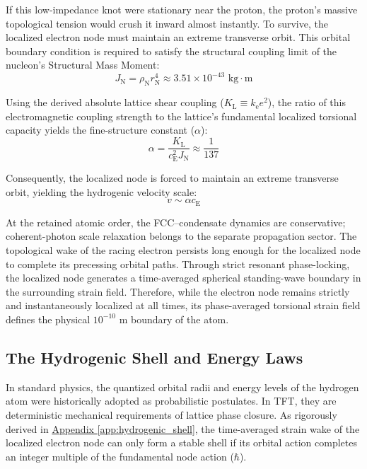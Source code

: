 If this low-impedance knot were stationary near the proton, the proton's massive topological tension would crush it inward almost instantly. To survive, the localized electron node must maintain an extreme transverse orbit. This orbital boundary condition is required to satisfy the structural coupling limit of the nucleon's Structural Mass Moment:
\begin{equation}
    J_{\mathrm{N}} = \rho_{\mathrm{N}} r_{\mathrm{N}}^4 \approx 3.51 \times 10^{-43} \text{ kg}\cdot\text{m}
\end{equation}

Using the derived absolute lattice shear coupling ($K_{\mathrm{L}} \equiv k_{\mathrm{e}} e^2$), the ratio of this electromagnetic coupling strength to the lattice's fundamental localized torsional capacity yields the fine-structure constant ($\alpha$):
\begin{equation}
    \alpha = \frac{K_{\mathrm{L}}}{c_{\mathrm{E}}^2 J_{\mathrm{N}}} \approx \frac{1}{137}
\end{equation}

Consequently, the localized node is forced to maintain an extreme transverse orbit, yielding the hydrogenic velocity scale:
\begin{equation}
    v \sim \alpha c_{\mathrm{E}}
\end{equation}

At the retained atomic order, the FCC--condensate dynamics are conservative; coherent-photon scale relaxation belongs to the separate propagation sector.
The topological wake of the racing electron persists long enough for the localized node to complete its precessing orbital paths. Through strict resonant phase-locking, the localized node generates a time-averaged spherical standing-wave boundary in the surrounding strain field. Therefore, while the electron node remains strictly and instantaneously localized at all times, its phase-averaged torsional strain field defines the physical $10^{-10}$ m boundary of the atom.

\subsection*{The Hydrogenic Shell and Energy Laws}
In standard physics, the quantized orbital radii and energy levels of the hydrogen atom were historically adopted as probabilistic postulates. In TFT, they are deterministic mechanical requirements of lattice phase closure. As rigorously derived in \hyperref[app:hydrogenic_shell]{Appendix \ref*{app:hydrogenic_shell}}, the time-averaged strain wake of the localized electron node can only form a stable shell if its orbital action completes an integer multiple of the fundamental node action ($\hbar$).

